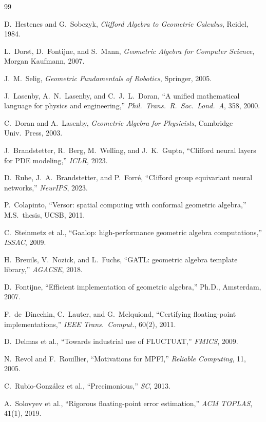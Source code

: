 \documentclass[11pt,a4paper]{article}
\theoremstyle{definition}
\theoremstyle{plain}
\theoremstyle{remark}
\begin{document}
\begin{thebibliography}{99}

D.~Hestenes and G.~Sobczyk,
\emph{Clifford Algebra to Geometric Calculus}, Reidel, 1984.

L.~Dorst, D.~Fontijne, and S.~Mann,
\emph{Geometric Algebra for Computer Science}, Morgan Kaufmann, 2007.

J.~M.~Selig,
\emph{Geometric Fundamentals of Robotics}, Springer, 2005.

J.~Lasenby, A.~N.~Lasenby, and C.~J.~L.~Doran,
``A unified mathematical language for physics and engineering,''
\emph{Phil.\ Trans.\ R.\ Soc.\ Lond.\ A}, 358, 2000.

C.~Doran and A.~Lasenby,
\emph{Geometric Algebra for Physicists}, Cambridge Univ.\ Press, 2003.

J.~Brandstetter, R.~Berg, M.~Welling, and J.~K.~Gupta,
``Clifford neural layers for PDE modeling,'' \emph{ICLR}, 2023.

D.~Ruhe, J.~A.~Brandstetter, and P.~Forr\'{e},
``Clifford group equivariant neural networks,'' \emph{NeurIPS}, 2023.

P.~Colapinto,
``Versor: spatial computing with conformal geometric algebra,''
M.S.\ thesis, UCSB, 2011.

C.~Steinmetz et al.,
``Gaalop: high-performance geometric algebra computations,''
\emph{ISSAC}, 2009.

H.~Breuils, V.~Nozick, and L.~Fuchs,
``GATL: geometric algebra template library,'' \emph{AGACSE}, 2018.

D.~Fontijne,
``Efficient implementation of geometric algebra,'' Ph.D., Amsterdam, 2007.

F.~de~Dinechin, C.~Lauter, and G.~Melquiond,
``Certifying floating-point implementations,''
\emph{IEEE Trans.\ Comput.}, 60(2), 2011.

D.~Delmas et al., ``Towards industrial use of FLUCTUAT,''
\emph{FMICS}, 2009.

N.~Revol and F.~Rouillier, ``Motivations for MPFI,''
\emph{Reliable Computing}, 11, 2005.

C.~Rubio-Gonz\'{a}lez et al., ``Precimonious,'' \emph{SC}, 2013.

A.~Solovyev et al., ``Rigorous floating-point error estimation,''
\emph{ACM TOPLAS}, 41(1), 2019.


\end{thebibliography}
\end{document}
